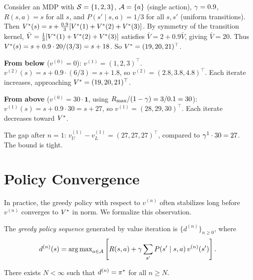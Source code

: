 \documentclass[11pt,a4paper]{article}
\begin{document}
\begin{example}
\label{ex:monotone-three-state}
Consider an MDP with $\mathcal{S} = \{1, 2, 3\}$, $\mathcal{A} = \{a\}$
(single action), $\gamma = 0.9$, $R(s,a) = s$ for all $s$, and
$P(s' \mid s, a) = 1/3$ for all $s, s'$ (uniform transitions). Then
$V^*(s) = s + \frac{0.9}{3}[V^*(1) + V^*(2) + V^*(3)]$.
By symmetry of the transition kernel,
$\bar{V} = \frac{1}{3}[V^*(1) + V^*(2) + V^*(3)]$
satisfies $\bar{V} = 2 + 0.9\bar{V}$, giving $\bar{V} = 20$. Thus
$V^*(s) = s + 0.9 \cdot 20/(3/3) = s + 18$.
So $V^* = (19, 20, 21)^\top$.

\textbf{From below} ($v^{(0)} = 0$):
$v^{(1)} = (1, 2, 3)^\top$. $v^{(2)}(s) = s + 0.9 \cdot (6/3) =
s + 1.8$, so $v^{(2)} = (2.8, 3.8, 4.8)^\top$. Each iterate
increases, approaching $V^* = (19, 20, 21)^\top$.

\textbf{From above} ($v^{(0)} = 30 \cdot \mathbf{1}$, using
$R_{\max}/(1-\gamma) = 3/0.1 = 30$):
$v^{(1)}(s) = s + 0.9 \cdot 30 = s + 27$, so
$v^{(1)} = (28, 29, 30)^\top$. Each iterate decreases toward $V^*$.

The gap after $n = 1$: $v^{(1)}_U - v^{(1)}_L = (27, 27, 27)^\top$,
compared to $\gamma^1 \cdot 30 = 27$. The bound is tight.
\end{example}


\section{Policy Convergence}
\label{sec:policy-convergence}

In practice, the greedy policy with respect to $v^{(n)}$ often
stabilizes long before $v^{(n)}$ converges to $V^*$ in norm.
We formalize this observation.

\begin{definition}
\label{def:greedy-sequence}
The \emph{greedy policy sequence} generated by value iteration is
$\{d^{(n)}\}_{n \geq 0}$, where
\[
    d^{(n)}(s) = \operatorname{arg\,max}_{a \in \mathcal{A}}
    \left[ R(s,a) + \gamma \sum_{s'} P(s' \mid s,a)\,
    v^{(n)}(s') \right].
\]
\end{definition}

\begin{theorem}
\label{thm:policy-stability}
There exists $N < \infty$ such that $d^{(n)} = \pi^*$ for all
$n \geq N$.
\end{theorem}
\end{document}
